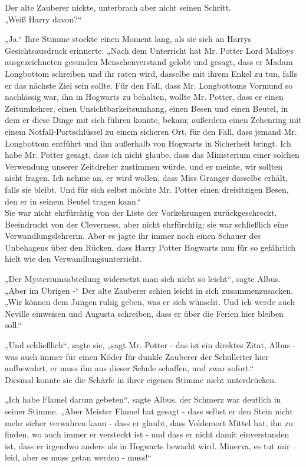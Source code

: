 {Der alte Zauberer nickte, unterbrach aber nicht seinen Schritt.\\ „Weiß Harry davon?“

„Ja.“ Ihre Stimme stockte einen Moment lang, als sie sich an Harrys Gesichtsausdruck erinnerte. „Nach dem Unterricht hat Mr. Potter Lord Malfoys ausgezeichneten gesunden Menschenverstand gelobt und gesagt, dass er Madam Longbottom schreiben und ihr raten wird, dasselbe mit ihrem Enkel zu tun, falls er das nächste Ziel sein sollte. Für den Fall, dass Mr. Longbottoms Vormund so nachlässig war, ihn in Hogwarts zu behalten, wollte Mr. Potter, dass er einen Zeitumkehrer, einen Unsichtbarkeitsumhang, einen Besen und einen Beutel, in dem er diese Dinge mit sich führen konnte, bekam; außerdem einen Zehenring mit einem Notfall-Portschlüssel zu einem sicheren Ort, für den Fall, dass jemand Mr. Longbottom entführt und ihn außerhalb von Hogwarts in Sicherheit bringt. Ich habe Mr. Potter gesagt, dass ich nicht glaube, dass das Ministerium einer solchen Verwendung unserer Zeitdreher zustimmen würde, und er meinte, wir sollten nicht fragen. Ich nehme an, er wird wollen, dass Miss Granger dasselbe erhält, falls sie bleibt. Und für sich selbst möchte Mr. Potter einen dreisitzigen Besen, den er in seinem Beutel tragen kann.“\\ Sie war nicht ehrfürchtig von der Liste der Vorkehrungen zurückgeschreckt. Beeindruckt von der Cleverness, aber nicht ehrfürchtig; sie war schließlich eine Verwandlungslehrerin. Aber es jagte ihr immer noch einen Schauer des Unbehagens über den Rücken, dass Harry Potter Hogwarts nun für so gefährlich hielt wie den Verwandlungsunterricht.

„Der Mysteriumsabteilung widersetzt man sich nicht so leicht“, sagte Albus. „Aber im Übrigen -“ Der alte Zauberer schien leicht in sich zusammenzusacken. „Wir können dem Jungen ruhig geben, was er sich wünscht. Und ich werde auch Neville einweisen und Augusta schreiben, dass er über die Ferien hier bleiben soll.“

„Und schließlich“, sagte sie, „sagt Mr. Potter - das ist ein direktes Zitat, Albus - was auch immer für einen Köder für dunkle Zauberer der Schulleiter hier aufbewahrt, er muss ihn aus dieser Schule schaffen, und zwar sofort.“\\ Diesmal konnte sie die Schärfe in ihrer eigenen Stimme nicht unterdrücken.

„Ich habe Flamel darum gebeten“, sagte Albus, der Schmerz war deutlich in seiner Stimme. „Aber Meister Flamel hat gesagt - dass selbst er den Stein nicht mehr sicher verwahren kann - dass er glaubt, dass Voldemort Mittel hat, ihn zu finden, wo auch immer er versteckt ist - und dass er nicht damit einverstanden ist, dass er irgendwo anders als in Hogwarts bewacht wird. Minerva, es tut mir leid, aber es muss getan werden - muss!“

}
